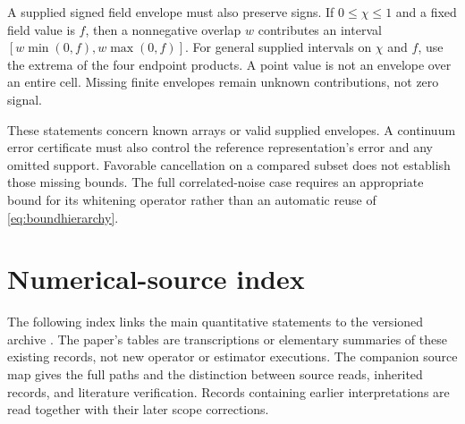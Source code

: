 A supplied signed field envelope must also preserve signs. If $0\leq\chi\leq1$ and a fixed field value is $f$, then a nonnegative overlap $w$ contributes an interval $[w\min(0,f),w\max(0,f)]$. For general supplied intervals on $\chi$ and $f$, use the extrema of the four endpoint products. A point value is not an envelope over an entire cell. Missing finite envelopes remain unknown contributions, not zero signal.

These statements concern known arrays or valid supplied envelopes. A continuum error certificate must also control the reference representation's error and any omitted support. Favorable cancellation on a compared subset does not establish those missing bounds. The full correlated-noise case requires an appropriate bound for its whitening operator rather than an automatic reuse of \eqref{eq:boundhierarchy}.

\Needspace{0.82\textheight}
\section{Numerical-source index}\label{app:records}
The following index links the main quantitative statements to the versioned archive \cite{archive}. The paper's tables are transcriptions or elementary summaries of these existing records, not new operator or estimator executions. The companion source map gives the full paths and the distinction between source reads, inherited records, and literature verification. Records containing earlier interpretations are read together with their later scope corrections.


